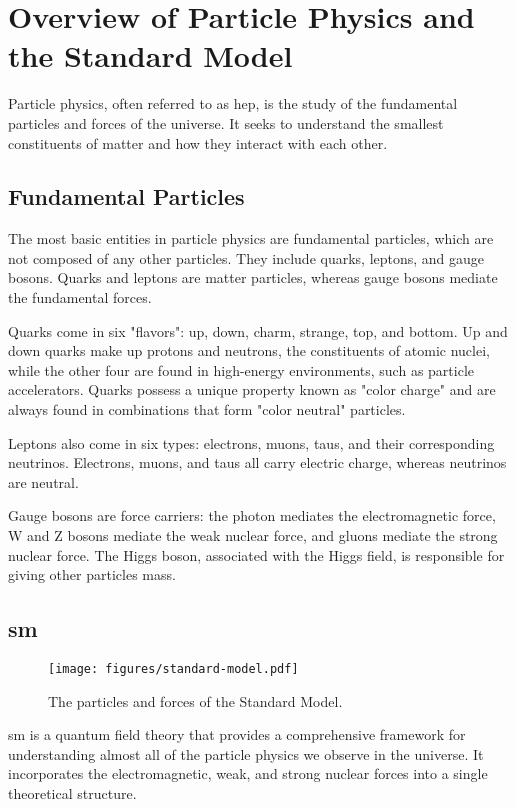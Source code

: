 \chapter{Overview of Particle Physics and the Standard Model}

Particle physics, often referred to as \gls{hep}, is the study of the fundamental particles and forces of the universe.
It seeks to understand the smallest constituents of matter and how they interact with each other.

\section{Fundamental Particles}

The most basic entities in particle physics are fundamental particles, which are not composed of any other particles.
They include quarks, leptons, and gauge bosons. Quarks and leptons are matter particles, whereas gauge bosons mediate
the fundamental forces.

Quarks come in six "flavors": up, down, charm, strange, top, and bottom. Up and down quarks make up protons and
neutrons, the constituents of atomic nuclei, while the other four are found in high-energy environments, such as
particle accelerators. Quarks possess a unique property known as "color charge" and are always found in combinations
that form "color neutral" particles.

Leptons also come in six types: electrons, muons, taus, and their corresponding neutrinos. Electrons, muons, and taus
all carry electric charge, whereas neutrinos are neutral.

Gauge bosons are force carriers: the photon mediates the electromagnetic force, W and Z bosons mediate the weak nuclear
force, and gluons mediate the strong nuclear force. The Higgs boson, associated with the Higgs field, is responsible for
giving other particles mass.

\section[Standard Model]{\gls{sm}}

\begin{figure}[htb]
    \centering
    \texttt{[image: figures/standard-model.pdf]}
    \caption{The particles and forces of the Standard Model.}
    \label{fig:standard-model}
\end{figure}

\gls{sm} is a quantum field theory that provides a comprehensive framework for understanding almost all
of the particle physics we observe in the universe. It incorporates the electromagnetic, weak, and strong nuclear forces
into a single theoretical structure.

